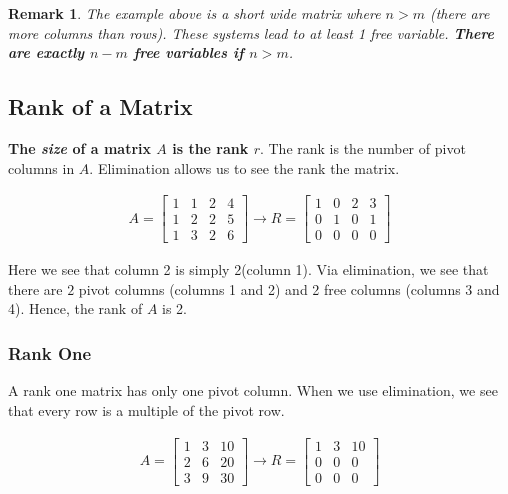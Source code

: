 \documentclass[12pt, letterpaper]{article}
\newtheorem*{remark}{Remark}
\theoremstyle{definition}
\begin{document}
	
	\begin{remark}
		The example above is a short wide matrix where $n>m$ (there are more columns than rows). These systems lead to at least 1 free variable. \textbf{There are exactly $n-m$ free variables if $n>m$}.	
	\end{remark}

\subsection{Rank of a Matrix}
	\textbf{The \textit{size} of a matrix $A$ is the rank $r$}. The rank is the number of pivot columns in $A$. Elimination allows us to see the rank the matrix.
	
		\begin{gather*}
			A = \begin{bmatrix}
						1 & 1 & 2 & 4 \\
						1 & 2 & 2 & 5 \\
						1 & 3 & 2 & 6
				\end{bmatrix} \rightarrow R = \begin{bmatrix}
												1 & 0 & 2 & 3 \\
												0 & 1 & 0 & 1 \\
												0 & 0 & 0 & 0
												\end{bmatrix}
		\end{gather*}
		
		Here we see that column 2 is simply 2(column 1). Via elimination, we see that there are $2$ pivot columns (columns 1 and 2) and 2 free columns (columns 3 and 4). Hence, the rank of $A$ is 2.
		
\subsubsection{Rank One}
	A rank one matrix has only one pivot column. When we use elimination, we see that every row is a multiple of the pivot row.
	
	\begin{gather*}
			A = \begin{bmatrix}
					1 & 3 & 10 \\
					2 & 6 & 20 \\
					3 & 9 & 30
					\end{bmatrix} \rightarrow R = \begin{bmatrix}
														1 & 3 & 10 \\
														0 & 0 & 0 \\
														0 & 0 & 0
														\end{bmatrix}
	\end{gather*}
	
\end{document}
